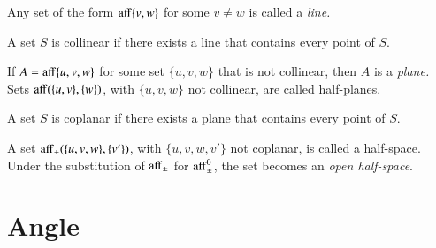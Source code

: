 


	
\begin{definition}[line]	
Any set of the form ${\operatorname{aff}}\{v,w\}$ for some $v\ne w$ is called a 
 {\it line.}
\end{definition}

\begin{definition}[collinear]  A set $S$ is collinear if there exists
a line that contains every point of $S$.
\end{definition}

\begin{definition}	
If $A={\operatorname{aff}}\{u,v,w\}$ for some set $\{u,v,w\}$ that is not collinear,
then $A$ is a {\it plane.}  Sets ${\operatorname{aff}}(\{u,v\},\{w\})$, with
$\{u,v,w\}$ not collinear, are called half-planes.
\end{definition}

\begin{definition}[coplanar] A set $S$ is  coplanar if there exists
a plane that contains every point of $S$.
\end{definition}

\begin{definition} A set ${\operatorname{aff}}_{\pm}(\{u,v,w\},\{v'\})$,
with $\{u,v,w,v'\}$ not coplanar, is called a half-space.  Under the substitution of
${\operatorname{aff}}_{\pm}$ for ${\operatorname{aff}}_{\pm}^0$, the set becomes an
{\it open half-space}.
\end{definition}

\section{Angle}\label{sec:angle}

